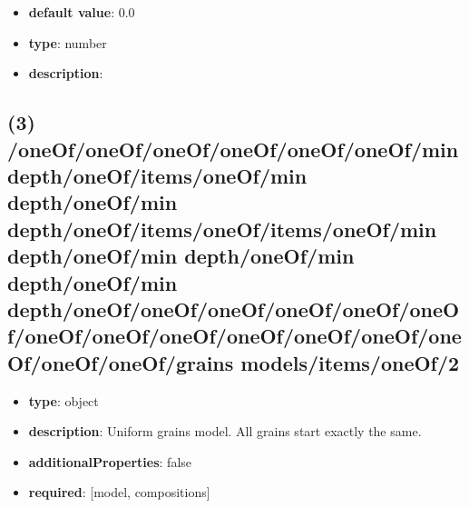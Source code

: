 \begin{itemize}[leftmargin=6em]\item {\bf default value}: 0.0
\item {\bf type}: number
\item {\bf description}: 
\end{itemize}\subsection{(3) /oneOf/oneOf/oneOf/oneOf/oneOf/oneOf/min depth/oneOf/items/oneOf/min depth/oneOf/min depth/oneOf/items/oneOf/items/oneOf/min depth/oneOf/min depth/oneOf/min depth/oneOf/min depth/oneOf/oneOf/oneOf/oneOf/oneOf/oneOf/oneOf/oneOf/oneOf/oneOf/oneOf/oneOf/oneOf/oneOf/oneOf/grains models/items/oneOf/2}
\begin{itemize}[leftmargin=3em]\item {\bf type}: object
\item {\bf description}: Uniform grains model. All grains start exactly the same.
\item {\bf additionalProperties}: false
\item {\bf required}: [model, compositions]\end{itemize}
